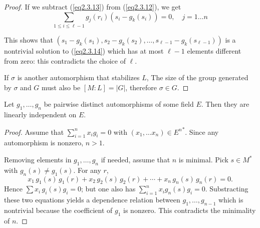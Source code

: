 \begin{proof}
If we subtract (\ref{eq2.3.13}) from (\ref{eq2.3.12}), we get
\begin{equation}
\sum_{1\leq i\leq \ell-1} g_j(r_i) (s_i-g_k(s_i)) = 0,\quad j=1\ldots n\end{equation}

This shows that $(s_{1}-g_{k}(s_{1}),s_{2}-g_{k}(s_{2}),\ldots,s_{\ell-1}-g_{k}(s_{\ell-1}))$ is a nontrivial solution to (\ref{eq2.3.14}) which has at most $\ell-1$ elements different from zero: this contradicts the choice of $\ell$.

\medskip
If $\sigma$ is another automorphism that stabilizes $L$, The size of the group generated by $\sigma$ and $G$ must also be $[M:L]=|G|$, therefore $\sigma \in G$.
\end{proof}

\begin{lem}
\label{lem:dedekind}
Let $g_1,\ldots,g_n$ be pairwise distinct automorphisms of some field $E$. Then they are linearly independent on $E$.
\end{lem}

\begin{proof}
Assume that $\sum_{i=1}^{n} x_i g_i =0$ with $(x_1,\ldots x_n) \in {E^n}^*$. Since any automorphism is nonzero, $n>1$.

Removing elements in $g_1,\ldots,g_n$ if needed, assume that $n$ is minimal. Pick $s\in M^{*}$ with $g_{n}(s)\neq g_{1}(s)$. For any $r$, 
\begin{equation}
\label{eq2.3.11}
x_{1}\,g_{1}(s) \, g_{1}(r) + x_{2}\, g_{2}(s)\, g_{2}(r) + \cdots + x_{n}\,  g_{n}(s)\, g_{n}(r) = 0 .
\end{equation}
Hence $\sum x_{i}\,g_{i}(s) g_i = 0$; but one also has  $\sum_{i=1}^{n} x_i g_n(s) g_i = 0$. Substracting these two equations yields a dependence relation between $g_1,\ldots,g_{n-1}$ which is nontrivial because the coefficient of $g_1$ is nonzero. This contradicts the minimality of $n$.
\end{proof}


%

